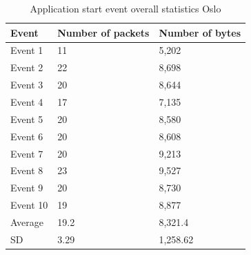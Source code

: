 \begin{table}[H]
\centering
\caption{Application start event overall statistics Oslo}
\label{tab:ASoverallOslo}
\begin{tabular}{|l|l|l|}
\hline
\textbf{Event} & \textbf{Number of packets} & \textbf{Number of bytes} \\ \hline
Event 1        & 11                     & 5,202                      \\ \hline
Event 2        & 22                     & 8,698                      \\ \hline
Event 3        & 20                     & 8,644                      \\ \hline
Event 4        & 17                     & 7,135                      \\ \hline
Event 5        & 20                     & 8,580                      \\ \hline
Event 6        & 20                     & 8,608                      \\ \hline
Event 7        & 20                     & 9,213                      \\ \hline
Event 8        & 23                     & 9,527                      \\ \hline
Event 9        & 20                     & 8,730                      \\ \hline
Event 10       & 19                     & 8,877                      \\ \hline
Average        & 19.2                   & 8,321.4                    \\ \hline
SD        & 3.29
       & 1,258.62               \\ \hline
\end{tabular}
\end{table}

